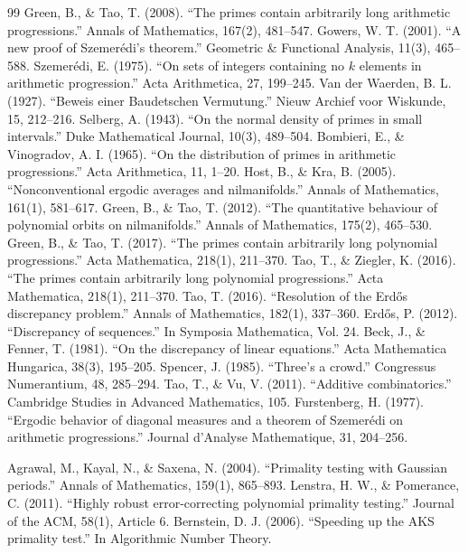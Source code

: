 \begin{thebibliography}{99}
 Green, B., \& Tao, T. (2008). ``The primes contain arbitrarily long arithmetic progressions.'' Annals of Mathematics, 167(2), 481--547.
 Gowers, W. T. (2001). ``A new proof of Szemer\'edi's theorem.'' Geometric \& Functional Analysis, 11(3), 465--588.
 Szemer\'edi, E. (1975). ``On sets of integers containing no $k$ elements in arithmetic progression.'' Acta Arithmetica, 27, 199--245.
 Van der Waerden, B. L. (1927). ``Beweis einer Baudetschen Vermutung.'' Nieuw Archief voor Wiskunde, 15, 212--216.
 Selberg, A. (1943). ``On the normal density of primes in small intervals.'' Duke Mathematical Journal, 10(3), 489--504.
 Bombieri, E., \& Vinogradov, A. I. (1965). ``On the distribution of primes in arithmetic progressions.'' Acta Arithmetica, 11, 1--20.
 Host, B., \& Kra, B. (2005). ``Nonconventional ergodic averages and nilmanifolds.'' Annals of Mathematics, 161(1), 581--617.
 Green, B., \& Tao, T. (2012). ``The quantitative behaviour of polynomial orbits on nilmanifolds.'' Annals of Mathematics, 175(2), 465--530.
 Green, B., \& Tao, T. (2017). ``The primes contain arbitrarily long polynomial progressions.'' Acta Mathematica, 218(1), 211--370.
 Tao, T., \& Ziegler, K. (2016). ``The primes contain arbitrarily long polynomial progressions.'' Acta Mathematica, 218(1), 211--370.
 Tao, T. (2016). ``Resolution of the Erdős discrepancy problem.'' Annals of Mathematics, 182(1), 337--360.
 Erdős, P. (2012). ``Discrepancy of sequences.'' In Symposia Mathematica, Vol. 24.
 Beck, J., \& Fenner, T. (1981). ``On the discrepancy of linear equations.'' Acta Mathematica Hungarica, 38(3), 195--205.
 Spencer, J. (1985). ``Three's a crowd.'' Congressus Numerantium, 48, 285--294.
 Tao, T., \& Vu, V. (2011). ``Additive combinatorics.'' Cambridge Studies in Advanced Mathematics, 105.
 Furstenberg, H. (1977). ``Ergodic behavior of diagonal measures and a theorem of Szemer\'edi on arithmetic progressions.'' Journal d'Analyse Mathematique, 31, 204--256.

 Agrawal, M., Kayal, N., \& Saxena, N. (2004). ``Primality testing with Gaussian periods.'' Annals of Mathematics, 159(1), 865--893.
 Lenstra, H. W., \& Pomerance, C. (2011). ``Highly robust error-correcting polynomial primality testing.'' Journal of the ACM, 58(1), Article 6.
 Bernstein, D. J. (2006). ``Speeding up the AKS primality test.'' In Algorithmic Number Theory.


\end{thebibliography}
